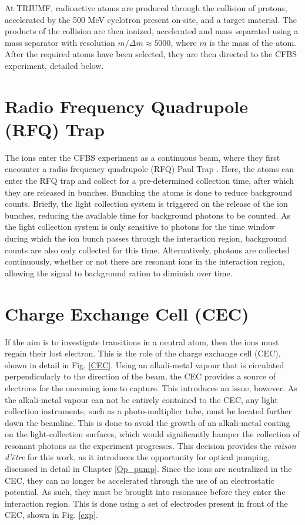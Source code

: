 At TRIUMF, radioactive atoms are produced through the collision of protons, accelerated by the 500 MeV cyclotron present on-site, and a target material. The products of the collision are then ionized, accelerated and mass separated using a mass separator with resolution $m/\Delta m \approx 5000$, where $m$ is the mass of the atom. \cite{CFBS} After the required atoms have been selected, they are then directed to the CFBS experiment, detailed below. 

\section{Radio Frequency Quadrupole (RFQ) Trap}

The ions enter the CFBS experiment as a continuous beam, where they first encounter a radio frequency quadrupole (RFQ) Paul Trap \cite{CFBS}. Here, the atoms can enter the RFQ trap and collect for a pre-determined collection time, after which they are released in bunches. Bunching the atoms is done to reduce background counts. Briefly, the light collection system is triggered on the release of the ion bunches, reducing the available time for background photons to be counted. As the light collection system is only sensitive to photons for the time window during which the ion bunch passes through the interaction region, background counts are also only collected for this time. Alternatively, photons are collected continuously, whether or not there are resonant ions in the interaction region, allowing the signal to background ration to diminish over time. 
\section{Charge Exchange Cell (CEC)}
If the aim is to investigate transitions in a neutral atom, then the ions must regain their lost electron. This is the role of the charge exchange cell (CEC), shown in detail in Fig. \ref{CEC}. Using an alkali-metal vapour that is circulated perpendicularly to the direction of the beam, the CEC provides a source of electrons for the oncoming ions to capture. This introduces an issue, however. As the alkali-metal vapour can not be entirely contained to the CEC, any light collection instruments, such as a photo-multiplier tube,  must be located further down the beamline. This is done to avoid the growth of an alkali-metal coating on the light-collection surfaces, which would significantly hamper the collection of resonant photons as the experiment progresses. This decision provides the \emph{raison d'être} for this work, as it introduces the opportunity for optical pumping, discussed in detail in Chapter \ref{Op_pump}. Since the ions are neutralized in the CEC, they can no longer be accelerated through the use of an electrostatic potential. As such, they must be brought into resonance before they enter the interaction region. This is done using a set of electrodes present in front of the CEC, shown in Fig. \ref{exp}.

